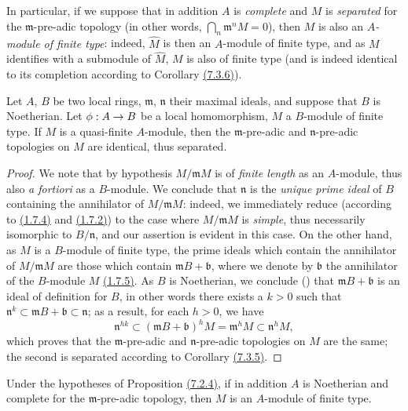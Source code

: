 In particular, if we suppose that in addition $A$ is {\em complete} and $M$ is
{\em separated} for the $\mathfrak{m}$-pre-adic topology (in other words,
$\bigcap_n\mathfrak{m}^n M=0$), then $M$ is also an {\em $A$-module of finite type}: indeed,
$\widehat{M}$ is then an $A$-module of finite type, and as $M$ identifies with a submodule of
$\widehat{M}$, $M$ is also of finite type (and is indeed identical to its completion
according to Corollary \hyperref[0.7.3.6]{(7.3.6)}).

\begin{prop}[7.4.2]
\label{0.7.4.2}
Let $A$, $B$ be two local rings, $\mathfrak{m}$, $\mathfrak{n}$ their maximal ideals, and
suppose that $B$ is Noetherian. Let $\phi:A\to B$ be a local homomorphism, $M$ a $B$-module
of finite type. If $M$ is a quasi-finite $A$-module, then the $\mathfrak{m}$-pre-adic and
$\mathfrak{n}$-pre-adic topologies on $M$ are identical, thus separated.
\end{prop}

\begin{proof}
\label{proof-0.7.4.2}
We note that by hypothesis $M/\mathfrak{m}M$ is of {\em finite length} as an $A$-module,
thus also {\em a fortiori} as a $B$-module. We conclude that $\mathfrak{n}$ is the
{\em unique prime ideal} of $B$ containing the annihilator of $M/\mathfrak{m}M$: indeed, we
immediately reduce (according to \hyperref[0.1.7.4]{(1.7.4)} and
\hyperref[0.1.7.2]{(1.7.2)}) to the case where $M/\mathfrak{m}M$ is {\em simple}, thus
necessarily isomorphic to $B/\mathfrak{n}$, and our assertion is evident in this case. On
the other hand, as $M$ is a $B$-module of finite type, the prime ideals which contain the
annihilator of $M/\mathfrak{m}M$ are those which contain $\mathfrak{m}B+\mathfrak{b}$, where
we denote by $\mathfrak{b}$ the annihilator of the $B$-module $M$
\hyperref[0.1.7.5]{(1.7.5)}. As $B$ is Noetherian, we conclude
(\cite[p.~127, Cor.~4]{I-11}) that $\mathfrak{m}B+\mathfrak{b}$ is an ideal
of definition for $B$, in other words there exists a $k>0$ such that
$\mathfrak{n}^k\subset\mathfrak{m}B+\mathfrak{b}\subset\mathfrak{n}$; as a result, for each
$h>0$, we have
\[
  \mathfrak{n}^{hk}\subset(\mathfrak{m}B+\mathfrak{b})^h M
  =\mathfrak{m}^h M\subset\mathfrak{n}^h M,
\]
which proves that the $\mathfrak{m}$-pre-adic and $\mathfrak{n}$-pre-adic topologies on $M$
are the same; the second is separated according to Corollary \hyperref[0.7.3.5]{(7.3.5)}.
\end{proof}

\begin{cor}[7.4.3]
\label{0.7.4.3}
Under the hypotheses of Proposition \hyperref[0.7.2.4]{(7.2.4)}, if in addition $A$ is
Noetherian and complete for the $\mathfrak{m}$-pre-adic topology, then $M$ is an $A$-module
of finite type.
\end{cor}

